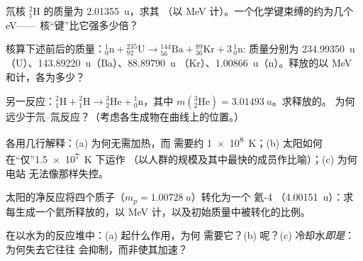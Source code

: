\begin{exercise}[$\star\star$]\label{exo:g12:nuclear-energy:6}
氘核 ${}^{2}_{1}\mathrm{H}$ 的质量为 \qty{2.01355}{u}，求其
（以 \unit{MeV} 计）。一个化学键束缚的约为几个 \unit{eV}——
核“键”比它强多少倍？
\end{exercise}

\begin{exercise}[$\star\star$]\label{exo:g12:nuclear-energy:7}
核算下述前后的质量：${}^{1}_{0}\mathrm{n} + {}^{235}_{92}\mathrm{U} \to
{}^{144}_{56}\mathrm{Ba} + {}^{89}_{36}\mathrm{Kr} + 3\,{}^{1}_{0}\mathrm{n}$:
质量分别为 \qty{234.99350}{u}（U）、\qty{143.89220}{u}（Ba）、\qty{88.89790}{u}
（Kr）、\qty{1.00866}{u}（n）。释放的以 \unit{MeV} 和计，各为多少？
\end{exercise}

\begin{exercise}[$\star\star$]\label{exo:g12:nuclear-energy:8}
另一反应：${}^{2}_{1}\mathrm{H} + {}^{2}_{1}\mathrm{H} \to
{}^{3}_{2}\mathrm{He} + {}^{1}_{0}\mathrm{n}$，其中
$m({}^{3}_{2}\mathrm{He}) = \qty{3.01493}{u}$。求释放的。
为何远少于氘–氚反应？（考虑各生成物在曲线上的位置。）
\end{exercise}

\begin{exercise}[$\star\star$]\label{exo:g12:nuclear-energy:9}
各用几行解释：(a) 为何无需加热，而
需要约 \qty{1e8}{K}；(b) 太阳如何在“仅”\qty{1.5e7}{K} 下运作
（以人群的规模及其中最快的成员作比喻）；(c) 为何电站
无法像那样失控。
\end{exercise}

\begin{exercise}[$\star\star$]\label{exo:g12:nuclear-energy:10}
太阳的净反应将四个质子（$m_p = \qty{1.00728}{u}$）转化为一个
氦-4 （\qty{4.00151}{u}）：求每生成一个氦所释放的，以
\unit{MeV} 计，以及初始质量中被转化的比例。
\end{exercise}

\begin{exercise}[$\star\star$]\label{exo:g12:nuclear-energy:11}
在以水为的反应堆中：(a) 起什么作用，为何
需要它？(b) 呢？(c) 冷却水\emph{即是}：为何失去它往往
会抑制，而非使其加速？
\end{exercise}

